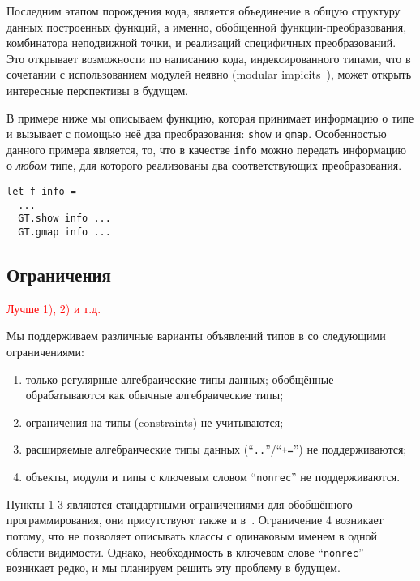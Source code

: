 Последним этапом порождения кода, является объединение в общую структуру данных построенных функций, а именно, обобщенной функции-преобразования, комбинатора неподвижной точки, и реализаций специфичных преобразований. Это открывает возможности по написанию кода, индексированного типами, что в сочетании с использованием модулей неявно (modular impicits~\cite{ModularImplicits}), может открыть интересные перспективы в будущем. 

В примере ниже мы описываем функцию, которая принимает информацию о типе и вызывает с помощью неё два преобразования: \lstinline{show} и \lstinline{gmap}.
Особенностью данного примера является, то, что в качестве \lstinline{info} можно передать информацию о \emph{любом} типе, для которого реализованы два соответствующих преобразования.


\begin{lstlisting}
let f info = 
  ... 
  GT.show info ...
  GT.gmap info ...
\end{lstlisting}


\subsection{Ограничения}

\textcolor{red}{Лучше 1), 2) и т.д.}

Мы поддерживаем различные варианты объявлений типов в  \ocaml{} со следующими ограничениями:

\begin{enumerate}
\item только регулярные алгебраические типы данных; обобщённые~\cite{GADT} обрабатываются как обычные алгебраические типы;
\item ограничения на типы (constraints) не учитываются;
\item расширяемые алгебраические типы данных
(``\lstinline{..}''/``\lstinline{+=}'') не поддерживаются;
\item объекты, модули и типы с ключевым словом ``\lstinline{nonrec}'' не поддерживаются.
\end{enumerate}

\noindent Пункты 1-3 являются стандартными ограничениями для обобщённого программирования, они присутствуют также и в~\cite{ppxderiving}. Ограничение 4 возникает потому, что \ocaml{} не позволяет описывать классы с одинаковым именем в одной области видимости. Однако,  необходимость в ключевом слове ``\lstinline{nonrec}'' возникает редко, и мы планируем решить эту проблему в будущем.




